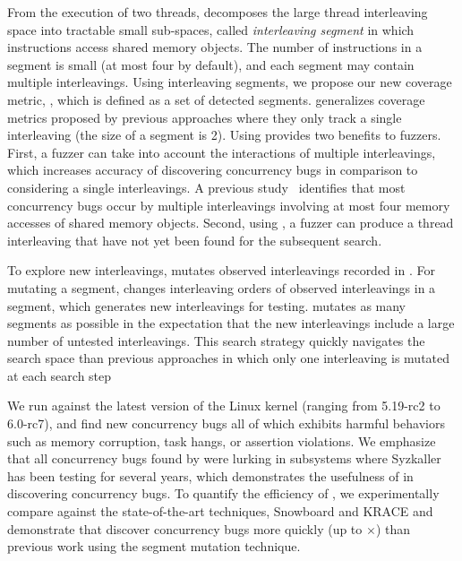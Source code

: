  From the execution of two threads,  
\sys decomposes the large thread interleaving space into tractable 
small sub-spaces, called \textit{interleaving segment} in which
instructions access shared memory objects. The number of instructions 
in a segment is small (at most four by default), and each segment may 
contain multiple interleavings. Using interleaving segments, we propose 
our new coverage metric, \textit{\intcov}, which is defined as a set of detected segments. \Intcov generalizes coverage 
metrics proposed by previous approaches where they only track 
a single interleaving (the size of a segment is 2). 
Using \intcov provides two benefits to fuzzers. First, a fuzzer can 
take into account the interactions of multiple interleavings, which increases
accuracy of discovering concurrency bugs in comparison to considering a single 
interleavings. A previous study~\cite{learningfrommistakes} identifies that
most concurrency bugs occur by multiple interleavings involving 
at most four memory accesses of shared memory objects.
Second, using \intcov, a fuzzer can produce a thread interleaving
that have not yet been found for the subsequent search.

%
To explore new interleavings,
\sys mutates observed interleavings recorded in \intcov. For mutating a segment, \sys changes interleaving orders of observed interleavings 
in a segment, which generates new interleavings for testing. \sys 
mutates as many segments as possible in the expectation that the 
new interleavings include a large number of untested interleavings. 
This search strategy quickly navigates the search space than previous 
approaches in which only one interleaving is mutated at each search step

We run \sys against the latest version of the Linux kernel (ranging
from 5.19-rc2 to 6.0-rc7), and find new \totalbugs concurrency bugs all of
which exhibits harmful behaviors such as memory corruption,
task hangs, or assertion violations. We emphasize that all
concurrency bugs found by \sys were lurking in subsystems where
Syzkaller~\cite{syzkaller} has been testing for several years, which
demonstrates the usefulness of \sys in discovering concurrency bugs.
%
To quantify the efficiency of \sys, we experimentally compare \sys 
against the state-of-the-art techniques, Snowboard and KRACE and 
demonstrate that \sys discover concurrency bugs more quickly 
(up to $\times$) than previous work using the segment mutation 
technique.

